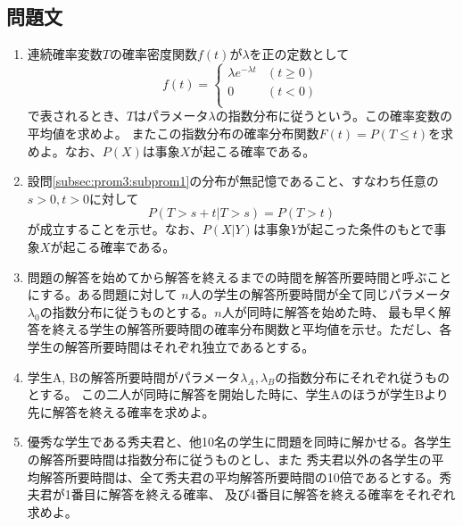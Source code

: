 \subsection{問題文}
\begin{enumerate}[(1)]
    \item 連続確率変数$T$の確率密度関数$f(t)$が$\lambda$を正の定数として
        \begin{equation*}
            f(t) = 
            \begin{cases}
                \lambda e^{-\lambda t} & (t\geq 0)\\    
                0 & (t < 0)\\    
            \end{cases}
        \end{equation*}
        で表されるとき、$T$はパラメータ$\lambda$の指数分布に従うという。この確率変数の平均値を求めよ。
        またこの指数分布の確率分布関数$F(t) = P (T\leq t)$を求めよ。なお、$P(X)$は事象$X$が起こる確率である。\label{subsec:prom3:subprom1}
    \item 設問\eqref{subsec:prom3:subprom1}の分布が無記憶であること、すなわち任意の$s > 0, t > 0$に対して
        \begin{equation*}
            P(T > s + t | T > s) = P(T > t)
        \end{equation*}
        が成立することを示せ。なお、$P(X|Y)$は事象$Y$が起こった条件のもとで事象$X$が起こる確率である。\label{subsec:prom3:subprom2}
    \item 問題の解答を始めてから解答を終えるまでの時間を解答所要時間と呼ぶことにする。ある問題に対して
        $n$人の学生の解答所要時間が全て同じパラメータ$\lambda_0$の指数分布に従うものとする。$n$人が同時に解答を始めた時、
        最も早く解答を終える学生の解答所要時間の確率分布関数と平均値を示せ。ただし、各学生の解答所要時間はそれぞれ独立であるとする。\label{subsec:prom3:subprom3}
    \item 学生A, Bの解答所要時間がパラメータ$\lambda_A, \lambda_B$の指数分布にそれぞれ従うものとする。
        この二人が同時に解答を開始した時に、学生Aのほうが学生Bより先に解答を終える確率を求めよ。\label{subsec:prom3:subprom4}
    \item 優秀な学生である秀夫君と、他10名の学生に問題を同時に解かせる。各学生の解答所要時間は指数分布に従うものとし、また
    秀夫君以外の各学生の平均解答所要時間は、全て秀夫君の平均解答所要時間の10倍であるとする。秀夫君が1番目に解答を終える確率、
    及び4番目に解答を終える確率をそれぞれ求めよ。\label{subsec:prom3:subprom5}
\end{enumerate}
\newpage
